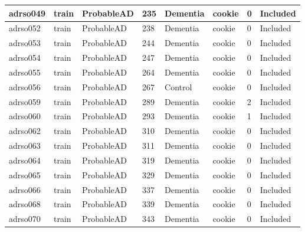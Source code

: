 \begin{center}
\begin{longtable}{|l|l|l|l|l|l|l|l|}
adrso049  & train            & ProbableAD   & 235         & Dementia             & cookie          & 0                & Included      \\ \hline
adrso052  & train            & ProbableAD   & 238         & Dementia             & cookie          & 0                & Included      \\ \hline
adrso053  & train            & ProbableAD   & 244         & Dementia             & cookie          & 0                & Included      \\ \hline
adrso054  & train            & ProbableAD   & 247         & Dementia             & cookie          & 0                & Included      \\ \hline
adrso055  & train            & ProbableAD   & 264         & Dementia             & cookie          & 0                & Included      \\ \hline
adrso056  & train            & ProbableAD   & 267         & Control              & cookie          & 0                & Included      \\ \hline
adrso059  & train            & ProbableAD   & 289         & Dementia             & cookie          & 2                & Included      \\ \hline
adrso060  & train            & ProbableAD   & 293         & Dementia             & cookie          & 1                & Included      \\ \hline
adrso062  & train            & ProbableAD   & 310         & Dementia             & cookie          & 0                & Included      \\ \hline
adrso063  & train            & ProbableAD   & 311         & Dementia             & cookie          & 0                & Included      \\ \hline
adrso064  & train            & ProbableAD   & 319         & Dementia             & cookie          & 0                & Included      \\ \hline
adrso065  & train            & ProbableAD   & 329         & Dementia             & cookie          & 0                & Included      \\ \hline
adrso066  & train            & ProbableAD   & 337         & Dementia             & cookie          & 0                & Included      \\ \hline
adrso068  & train            & ProbableAD   & 339         & Dementia             & cookie          & 0                & Included      \\ \hline
adrso070  & train            & ProbableAD   & 343         & Dementia             & cookie          & 0                & Included      \\ \hline

\end{longtable}
\end{center}
